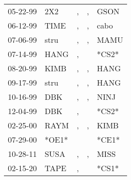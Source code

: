 \begin{supertabular}{lllll}
 05-22-99 &    2X2 &             , &             , &   GSON \\
 06-12-99 &   TIME &             , &             , &   cabo \\
 07-06-99 &   stru &             , &             , &   MAMU \\
 07-14-99 &   HANG &             , &               &  *CS2* \\
 08-20-99 &   KIMB &             , &             , &   HANG \\
 09-17-99 &   stru &             , &             , &   HANG \\
 10-16-99 &    DBK &             , &             , &   NINJ \\
 12-04-99 &    DBK &             , &               &  *CS2* \\
 02-25-00 &   RAYM &             , &             , &   KIMB \\
 07-29-00 &  *OE1* &               &               &  *CE1* \\
 10-28-11 &   SUSA &             , &             , &   MISS \\
 02-15-20 &   TAPE &             , &               &  *CS1* \\
\end{supertabular}
